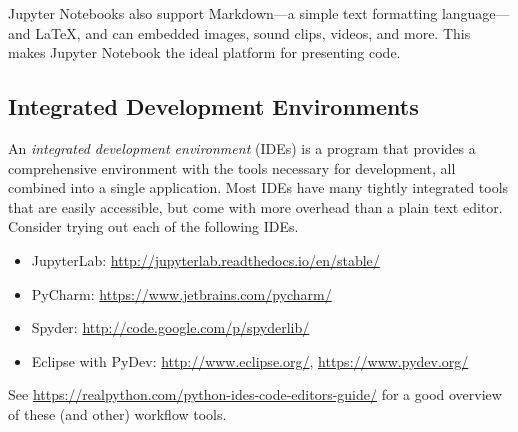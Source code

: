 Jupyter Notebooks also support Markdown---a simple text formatting language---and \LaTeX, and can embedded images, sound clips, videos, and more.
This makes Jupyter Notebook the ideal platform for presenting code.

\subsection*{Integrated Development Environments} %

An \emph{integrated development environment} (IDEs) is a program that provides a comprehensive environment with the tools necessary for development, all combined into a single application.
Most IDEs have many tightly integrated tools that are easily accessible, but come with more overhead than a plain text editor.
Consider trying out each of the following IDEs.
\begin{itemize}

\item JupyterLab: \url{http://jupyterlab.readthedocs.io/en/stable/}

\item PyCharm: \url{https://www.jetbrains.com/pycharm/}

\item Spyder: \url{http://code.google.com/p/spyderlib/}

\item Eclipse with PyDev: \url{http://www.eclipse.org/}, \url{https://www.pydev.org/}
%
\end{itemize}
See \url{https://realpython.com/python-ides-code-editors-guide/} for a good overview of these (and other) workflow tools.
